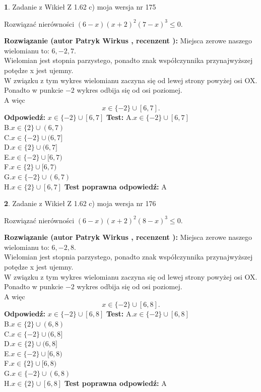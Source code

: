 \documentclass[12pt, a4paper]{article}
\theoremstyle{definition} %
\newtheorem{zad}{}
\newcommand{\zadStart}[1]{\begin{zad}#1\newline}
\newcommand{\zadStop}{\end{zad}}
\newcommand{\rozwStart}[2]{\noindent \textbf{Rozwiązanie (autor #1 , recenzent #2): }\newline}
\newcommand{\rozwStop}{\newline}
\newcommand{\odpStart}{\noindent \textbf{Odpowiedź:}\newline}
\newcommand{\odpStop}{\newline}
\newcommand{\testStart}{\noindent \textbf{Test:}\newline}
\newcommand{\testStop}{\newline}
\newcommand{\kluczStart}{\noindent \textbf{Test poprawna odpowiedź:}\newline}
\newcommand{\kluczStop}{\newline}
\begin{document}
\zadStart{Zadanie z Wikieł Z 1.62 c) moja wersja nr 175}

Rozwiązać nierówności $(6-x)(x+2)^{2}(7-x)^{3}\le0$.
\zadStop
\rozwStart{Patryk Wirkus}{}
Miejsca zerowe naszego wielomianu to: $6, -2, 7$.\\
Wielomian jest stopnia parzystego, ponadto znak współczynnika przy\linebreak najwyższej potędze x jest ujemny.\\ W związku z tym wykres wielomianu zaczyna się od lewej strony powyżej osi OX.\\
Ponadto w punkcie $-2$ wykres odbija się od osi poziomej.\\
A więc $$x \in \{-2\} \cup [6,7].$$
\rozwStop
\odpStart
$x \in \{-2\} \cup [6,7]$
\odpStop
\testStart
A.$x \in \{-2\} \cup [6,7]$\\
B.$x \in \{2\} \cup (6,7)$\\
C.$x \in \{-2\} \cup (6,7]$\\
D.$x \in \{2\} \cup (6,7]$\\
E.$x \in \{-2\} \cup [6,7)$\\
F.$x \in \{2\} \cup [6,7)$\\
G.$x \in \{-2\} \cup (6,7)$\\
H.$x \in \{2\} \cup [6,7]$
\testStop
\kluczStart
A
\kluczStop



\zadStart{Zadanie z Wikieł Z 1.62 c) moja wersja nr 176}

Rozwiązać nierówności $(6-x)(x+2)^{2}(8-x)^{3}\le0$.
\zadStop
\rozwStart{Patryk Wirkus}{}
Miejsca zerowe naszego wielomianu to: $6, -2, 8$.\\
Wielomian jest stopnia parzystego, ponadto znak współczynnika przy\linebreak najwyższej potędze x jest ujemny.\\ W związku z tym wykres wielomianu zaczyna się od lewej strony powyżej osi OX.\\
Ponadto w punkcie $-2$ wykres odbija się od osi poziomej.\\
A więc $$x \in \{-2\} \cup [6,8].$$
\rozwStop
\odpStart
$x \in \{-2\} \cup [6,8]$
\odpStop
\testStart
A.$x \in \{-2\} \cup [6,8]$\\
B.$x \in \{2\} \cup (6,8)$\\
C.$x \in \{-2\} \cup (6,8]$\\
D.$x \in \{2\} \cup (6,8]$\\
E.$x \in \{-2\} \cup [6,8)$\\
F.$x \in \{2\} \cup [6,8)$\\
G.$x \in \{-2\} \cup (6,8)$\\
H.$x \in \{2\} \cup [6,8]$
\testStop
\kluczStart
A
\kluczStop
\end{document}
